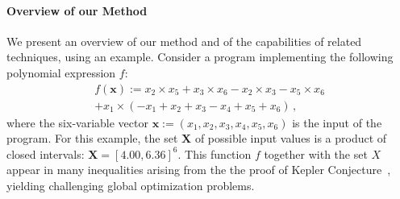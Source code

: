 \documentclass[preprint,fleqn,nocopyrightspace]{sigplanconf}
\newcommand{\x}{\mathbf{x}}
\def\X{\mathbf{X}}
\theoremstyle{plain}
\begin{document}
\paragraph{Overview of our Method}
%
We present an overview of our method and of the capabilities of related techniques, using an example.
Consider a program implementing the following polynomial expression $f$:
\begin{align*}
f(\x) := x_2 \times x_5 + x_3 \times x_6 - x_2 \times x_3  - x_5 \times x_6 \\
+ x_1 \times ( - x_1 +  x_2 +  x_3  - x_4 +  x_5 +  x_6) \,,
\end{align*}
%
where the six-variable vector $\x :=  (x_1, x_2, x_3, x_4, x_5, x_6)$ is the input of the program. For this example, the set $\X$ of possible input values is a product of closed intervals: $\X = [4.00, 6.36]^6$.
This function $f$ together with the set $X$ appear in many inequalities arising from the the proof of Kepler Conjecture~\cite{halesalgo}, yielding challenging global optimization problems.

\end{document}
